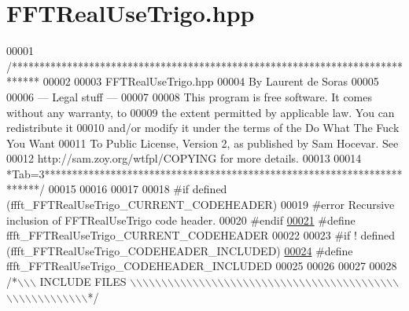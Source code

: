 \hypertarget{a00107_source}{\section{F\+F\+T\+Real\+Use\+Trigo.\+hpp}
\label{a00107_source}
}

\begin{DoxyCode}
00001 \textcolor{comment}{/*****************************************************************************}
00002 \textcolor{comment}{}
00003 \textcolor{comment}{        FFTRealUseTrigo.hpp}
00004 \textcolor{comment}{        By Laurent de Soras}
00005 \textcolor{comment}{}
00006 \textcolor{comment}{--- Legal stuff ---}
00007 \textcolor{comment}{}
00008 \textcolor{comment}{This program is free software. It comes without any warranty, to}
00009 \textcolor{comment}{the extent permitted by applicable law. You can redistribute it}
00010 \textcolor{comment}{and/or modify it under the terms of the Do What The Fuck You Want}
00011 \textcolor{comment}{To Public License, Version 2, as published by Sam Hocevar. See}
00012 \textcolor{comment}{http://sam.zoy.org/wtfpl/COPYING for more details.}
00013 \textcolor{comment}{}
00014 \textcolor{comment}{*Tab=3***********************************************************************/}
00015 
00016 
00017 
00018 \textcolor{preprocessor}{#if defined (ffft\_FFTRealUseTrigo\_CURRENT\_CODEHEADER)}
00019 \textcolor{preprocessor}{    #error Recursive inclusion of FFTRealUseTrigo code header.}
00020 \textcolor{preprocessor}{#endif}
\hypertarget{a00107_source_l00021}{}\hyperlink{a00107_a0a6588ccc4a0aa953c4e408342130fb7}{00021} \textcolor{preprocessor}{#define ffft\_FFTRealUseTrigo\_CURRENT\_CODEHEADER}
00022 
00023 \textcolor{preprocessor}{#if ! defined (ffft\_FFTRealUseTrigo\_CODEHEADER\_INCLUDED)}
\hypertarget{a00107_source_l00024}{}\hyperlink{a00107_a45d8a651c3a302e4a247c733967e13ed}{00024} \textcolor{preprocessor}{#define ffft\_FFTRealUseTrigo\_CODEHEADER\_INCLUDED}
00025 
00026 
00027 
00028 \textcolor{comment}{/*\(\backslash\)\(\backslash\)\(\backslash\) INCLUDE FILES \(\backslash\)\(\backslash\)\(\backslash\)\(\backslash\)\(\backslash\)\(\backslash\)\(\backslash\)\(\backslash\)\(\backslash\)\(\backslash\)\(\backslash\)\(\backslash\)\(\backslash\)\(\backslash\)\(\backslash\)\(\backslash\)\(\backslash\)\(\backslash\)\(\backslash\)\(\backslash\)\(\backslash\)\(\backslash\)\(\backslash\)\(\backslash\)\(\backslash\)\(\backslash\)\(\backslash\)\(\backslash\)\(\backslash\)\(\backslash\)\(\backslash\)\(\backslash\)\(\backslash\)\(\backslash\)\(\backslash\)\(\backslash\)\(\backslash\)\(\backslash\)\(\backslash\)\(\backslash\)\(\backslash\)\(\backslash\)\(\backslash\)\(\backslash\)\(\backslash\)\(\backslash\)\(\backslash\)\(\backslash\)\(\backslash\)\(\backslash\)\(\backslash\)\(\backslash\)\(\backslash\)\(\backslash\)\(\backslash\)\(\backslash\)*/}

\end{DoxyCode}
